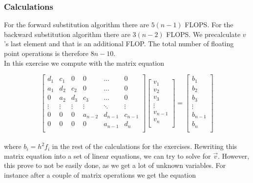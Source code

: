 \documentclass{article}
\begin{document}
  \subsubsection{Calculations}

    For the forward substitution algorithm there are $5(n-1)$ FLOPS. For the backward substitution algorithm there are $3(n-2)$ FLOPS. We precalculate $v$'s last element and that is an additional FLOP. The total number of floating point operations is therefore $8n - 10$. \\

    In this exercise we compute with the matrix equation

    \begin{equation*} \label{eq:fullmatrixeqforward}
      \begin{bmatrix}
        d_1 & c_1 & 0 & 0 & \dots & 0 \\
        a_1 & d_2 & c_2 & 0 & \dots & 0 \\
        0 & a_2 & d_3 & c_3 & \dots & 0 \\
        \vdots & \vdots & \vdots & \vdots & \ddots & \vdots \\
        0 & 0 & 0 & a_{n-2} & d_{n-1} & c_{n-1} \\
        0 & 0 & 0 & 0 & a_{n-1} & d_n \\
      \end{bmatrix}
      \begin{bmatrix}
        v_1 \\
        v_2 \\
        v_3 \\
        \vdots \\
        v_{n-1} \\
        v_n \\
      \end{bmatrix}
      =
      \begin{bmatrix}
        b_1 \\
        b_2 \\
        b_3 \\
        \vdots \\
        b_{n-1} \\
        b_n \\
      \end{bmatrix}
    \end{equation*} \\

    where $b_i = h^2 f_i$ in the rest of the calculations for the exercises. Rewriting this matrix equation into a set of linear equations, we can try to solve for $\vec{v}$. However, this prove to not be easily done, as we get a lot of unknown variables. For instance after a couple of matrix operations we get the equation
\end{document}

